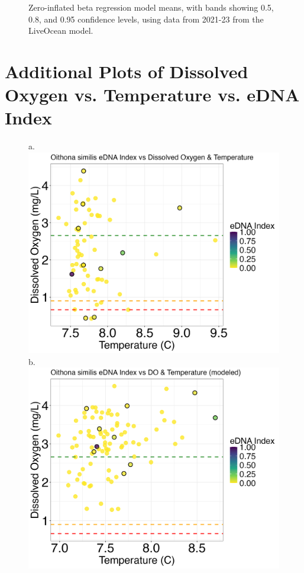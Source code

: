 \documentclass[12pt,twoside]{reedthesis}
\begin{document}
{\begin{figure}[h]
\begin{center}
			\caption[Zero-inflated beta regression means (modeled data)]{\footnotesize{Zero-inflated beta regression model means, with bands showing 0.5, 0.8, and 0.95 confidence levels, using data from 2021-23 from the LiveOcean model.}} %
			\label{ModZOIB}
		\end{center}
	\end{figure}
	
	\chapter{Additional Plots of Dissolved Oxygen vs. Temperature vs. eDNA Index}\label{chap:appPlots}
	
	\begin{figure}[!h]
		\begin{center}
			a. \includegraphics[scale=0.3]{Osimilis_Scatter_noOut}
			b. \includegraphics[scale=0.3]{Osimilis_Scatter_AllYr_mod_noOut}

\end{center}
\end{figure}}
\end{document}
